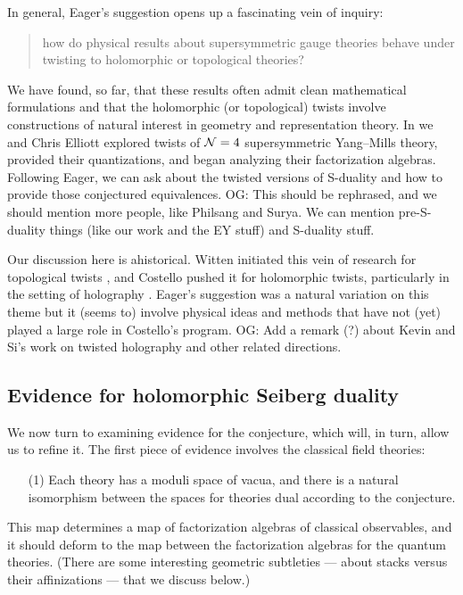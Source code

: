 \documentclass[11pt]{amsart}
\def\owen#1{{\textcolor{violet!65!black}{OG: {#1}}}}
\begin{document}
In general, Eager's suggestion opens up a fascinating vein of inquiry:
\begin{quote}
how do physical results about supersymmetric gauge theories behave under twisting to holomorphic or topological theories?
\end{quote}
We have found, so far, that these results often admit clean mathematical formulations and that the holomorphic (or topological) twists involve constructions of natural interest in geometry and representation theory.
In \cite{EGW} we and Chris Elliott explored twists of $\mathcal N=4$ supersymmetric Yang--Mills theory,
provided their quantizations, and began analyzing their factorization algebras.
Following Eager, we can ask about the twisted versions of S-duality and how to provide those conjectured equivalences.
\owen{This should be rephrased, and we should mention more people, like Philsang and Surya. We can mention pre-S-duality things (like our work and the EY stuff) and S-duality stuff.}

\begin{rmk}
Our discussion here is ahistorical.
Witten initiated this vein of research for topological twists \cite{},
and Costello pushed it for holomorphic twists, particularly in the setting of holography \cite{}.
Eager's suggestion was a natural variation on this theme but it (seems to) involve physical ideas and methods that have not (yet) played a large role in Costello's program.
\owen{Add a remark (?) about Kevin and Si's work on twisted holography and other related directions.}
\end{rmk}

\subsection{Evidence for holomorphic Seiberg duality}

We now turn to examining evidence for the conjecture, which will, in turn, allow us to refine it.
The first piece of evidence involves the classical field theories:
\begin{enumerate}
\item[(1)] Each theory has a moduli space of vacua, and there is a natural isomorphism between the spaces for theories dual according to the conjecture.
\end{enumerate}
This map determines a map of factorization algebras of classical observables,
and it should deform to the map between the factorization algebras for the quantum theories.
(There are some interesting geometric subtleties --- about stacks versus their affinizations --- that we discuss below.)
\end{document}
